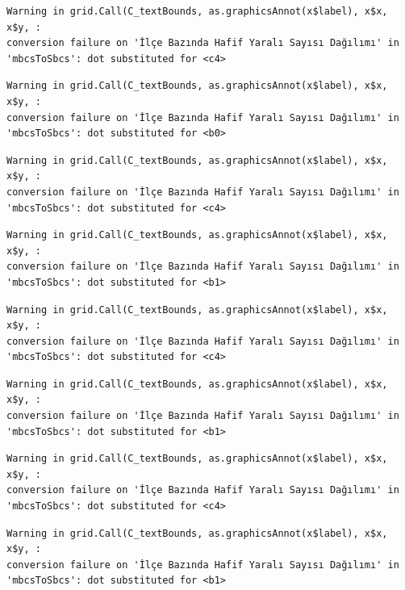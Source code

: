 \documentclass[
  11pt,
  a4paper,
  DIV=11,
  numbers=noendperiod]{scrartcl}
\begin{document}
\begin{verbatim}
Warning in grid.Call(C_textBounds, as.graphicsAnnot(x$label), x$x, x$y, :
conversion failure on 'İlçe Bazında Hafif Yaralı Sayısı Dağılımı' in
'mbcsToSbcs': dot substituted for <c4>
\end{verbatim}

\begin{verbatim}
Warning in grid.Call(C_textBounds, as.graphicsAnnot(x$label), x$x, x$y, :
conversion failure on 'İlçe Bazında Hafif Yaralı Sayısı Dağılımı' in
'mbcsToSbcs': dot substituted for <b0>
\end{verbatim}

\begin{verbatim}
Warning in grid.Call(C_textBounds, as.graphicsAnnot(x$label), x$x, x$y, :
conversion failure on 'İlçe Bazında Hafif Yaralı Sayısı Dağılımı' in
'mbcsToSbcs': dot substituted for <c4>
\end{verbatim}

\begin{verbatim}
Warning in grid.Call(C_textBounds, as.graphicsAnnot(x$label), x$x, x$y, :
conversion failure on 'İlçe Bazında Hafif Yaralı Sayısı Dağılımı' in
'mbcsToSbcs': dot substituted for <b1>
\end{verbatim}

\begin{verbatim}
Warning in grid.Call(C_textBounds, as.graphicsAnnot(x$label), x$x, x$y, :
conversion failure on 'İlçe Bazında Hafif Yaralı Sayısı Dağılımı' in
'mbcsToSbcs': dot substituted for <c4>
\end{verbatim}

\begin{verbatim}
Warning in grid.Call(C_textBounds, as.graphicsAnnot(x$label), x$x, x$y, :
conversion failure on 'İlçe Bazında Hafif Yaralı Sayısı Dağılımı' in
'mbcsToSbcs': dot substituted for <b1>
\end{verbatim}

\begin{verbatim}
Warning in grid.Call(C_textBounds, as.graphicsAnnot(x$label), x$x, x$y, :
conversion failure on 'İlçe Bazında Hafif Yaralı Sayısı Dağılımı' in
'mbcsToSbcs': dot substituted for <c4>
\end{verbatim}

\begin{verbatim}
Warning in grid.Call(C_textBounds, as.graphicsAnnot(x$label), x$x, x$y, :
conversion failure on 'İlçe Bazında Hafif Yaralı Sayısı Dağılımı' in
'mbcsToSbcs': dot substituted for <b1>
\end{verbatim}
\end{document}
